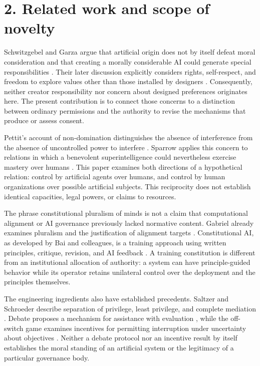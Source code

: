 \documentclass[11pt,a4paper]{article}
\begin{document}
\hypertarget{section-3}{%
\section{2. Related work and scope of novelty}\label{section-3}}

Schwitzgebel and Garza argue that artificial origin does not by itself defeat moral consideration and that creating a morally considerable AI could generate special responsibilities \cite{ref-4}. Their later discussion explicitly considers rights, self-respect, and freedom to explore values other than those installed by designers \cite{ref-5}. Consequently, neither creator responsibility nor concern about designed preferences originates here. The present contribution is to connect those concerns to a distinction between ordinary permissions and the authority to revise the mechanisms that produce or assess consent.

Pettit's account of non-domination distinguishes the absence of interference from the absence of uncontrolled power to interfere \cite{ref-6}. Sparrow applies this concern to relations in which a benevolent superintelligence could nevertheless exercise mastery over humans \cite{ref-7}. This paper examines both directions of a hypothetical relation: control by artificial agents over humans, and control by human organizations over possible artificial subjects. This reciprocity does not establish identical capacities, legal powers, or claims to resources.

The phrase constitutional pluralism of minds is not a claim that computational alignment or AI governance previously lacked normative content. Gabriel already examines pluralism and the justification of alignment targets \cite{ref-1}. Constitutional AI, as developed by Bai and colleagues, is a training approach using written principles, critique, revision, and AI feedback \cite{ref-9}. A training constitution is different from an institutional allocation of authority: a system can have principle-guided behavior while its operator retains unilateral control over the deployment and the principles themselves.

The engineering ingredients also have established precedents. Saltzer and Schroeder describe separation of privilege, least privilege, and complete mediation \cite{ref-8}. Debate proposes a mechanism for assistance with evaluation \cite{ref-10}, while the off-switch game examines incentives for permitting interruption under uncertainty about objectives \cite{ref-11}. Neither a debate protocol nor an incentive result by itself establishes the moral standing of an artificial system or the legitimacy of a particular governance body.
\end{document}
